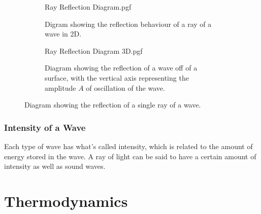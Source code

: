 \documentclass[main.tex]{subfiles}
\begin{document}
                    \begin{figure}[!h]
                        \centering
                        \vspace{-1em}
                        \begin{subfigure}[h]{0.45\textwidth}
                            \centering
                            \vspace{0.5em}
                            \scalebox{0.8}
                            {
                                \begin{adjustbox}{clip,trim=30mm 60mm 15mm 10mm}
                                    {{Ray Reflection Diagram.pgf}}
                                \end{adjustbox}
                            }

                            \caption{Digram showing the reflection behaviour of a ray of a wave in 2D.}
                        \end{subfigure}
                        \hfill
                        \begin{subfigure}[h]{0.45\textwidth}
                            \centering
                            \scalebox{0.45}
                            {
                                \begin{adjustbox}{clip,trim=180mm 80mm 130mm 50mm}
                                    {{Ray Reflection Diagram 3D.pgf}}
                                \end{adjustbox}
                            }

                            \caption{Diagram showing the reflection of a wave off of a surface, with the vertical axis representing the amplitude $A$ of oscillation of the wave.}
                        \end{subfigure}
                        
                        \caption{Diagram showing the reflection of a single ray of a wave.}
                        \label{fig: Wave Ray Reflection}
                    \end{figure}
                    \FloatBarrier
                    \vspace{2em}
                    
                \subsubsection{Intensity of a Wave}
                    \label{subsubsec: Intensity of a Wave}

                    Each type of wave has what's called intensity, which is related to the amount of energy stored in the wave. A ray of light can be said to have a certain amount of intensity as well as sound waves.


        \newpage
        \section{Thermodynamics}
            \label{sec: Thermodynamics}
\end{document}
